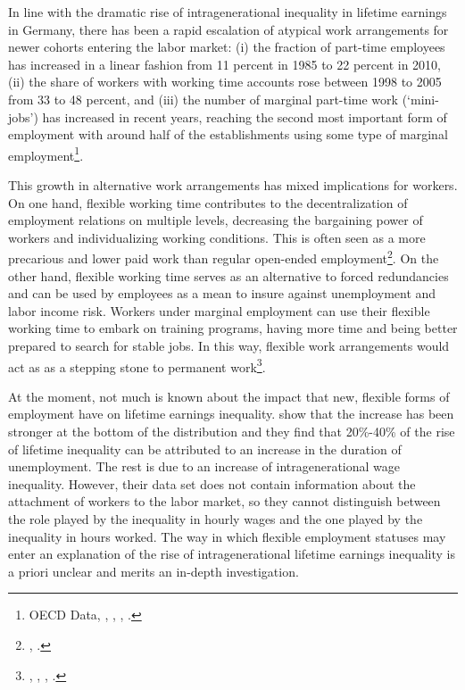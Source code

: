 \documentclass[12pt, a4paper]{article}
\begin{document}
In line with the dramatic rise of intragenerational inequality in lifetime earnings in Germany, there has been a rapid escalation of atypical work arrangements for newer cohorts entering the labor market: (i) the fraction of part-time employees has increased in a linear fashion from 11 percent in 1985 to 22 percent in 2010, (ii) the share of workers with working time accounts rose between 1998 to 2005 from 33 to 48 percent, and (iii) the number of marginal part-time work (`mini-jobs') has increased in recent years, reaching the second most important form of employment with around half of the establishments using some type of marginal employment\footnote{OECD Data, \cite{Gro2006}, \cite{Bechmann10}, \cite{CarriTuRo15}, \cite{Galasi16}.}.


This growth in alternative work arrangements has mixed implications for workers. On one hand, flexible working time contributes to the decentralization of employment relations on multiple levels, decreasing the bargaining power of workers and individualizing working conditions. This is often seen as a more precarious and lower paid work than regular open-ended employment\footnote{\cite{AddisonCotti15}, \cite{DuSpOe14}.}. On the other hand, flexible working time serves as an alternative to forced redundancies and can be used by employees as a mean to insure against unemployment and labor income risk. Workers under marginal employment can use their flexible working time to embark on training programs, having more time and being better prepared to search for stable jobs. In this way, flexible work arrangements would act as as a stepping stone to permanent work\footnote{\cite{Berg2008}, \cite{Seifert2006}, \cite{Caliendo2016}, \cite{Booth02}.}.




At the moment, not much is known about the impact that new, flexible forms of employment have on lifetime earnings inequality.  \cite{BoCo15} show that the increase has been stronger at the bottom of the distribution and they find that 20\%-40\% of the rise of lifetime inequality can be attributed to an increase in the duration of unemployment. The rest is due to an increase of intragenerational wage inequality. However, their data set does not contain information about the attachment of workers to the labor market, so they cannot distinguish between the role played by the inequality in hourly wages and the one played by the inequality in hours worked. The way in which flexible employment statuses may enter an explanation of the rise of intragenerational lifetime earnings inequality is a priori unclear and merits an in-depth investigation.
\end{document}
